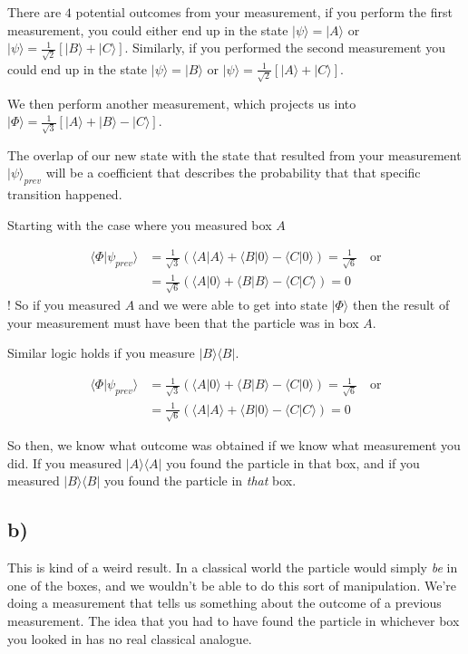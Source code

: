 \documentclass{article}
\newcommand{\p}[1]{\left(#1\right)}
\newcommand{\braket}[1]{\langle#1\rangle}
\newcommand{\bra}[1]{|#1\rangle}
\newcommand{\ket}[1]{\langle#1|}
\begin{document}

There are $4$ potential outcomes from your measurement, if you perform the first measurement, you could either end up in the state $\bra{\psi}=\bra{A}$ or $\bra{\psi}=\frac{1}{\sqrt{2}}[\bra{B}+\bra{C}]$. Similarly, if you performed the second measurement you could end up in the state $\bra{\psi}=\bra{B}$ or $\bra{\psi}=\frac{1}{\sqrt{2}}[\bra{A}+\bra{C}]$.

We then perform another measurement, which projects us into $\bra{\Phi}=\frac{1}{\sqrt{3}}[\bra{A}+\bra{B}-\bra{C}]$. 

The overlap of our new state with the state that resulted from your measurement $\bra{\psi}_{prev}$ will be a coefficient that describes the probability that that specific transition happened.

Starting with the case where you measured box $A$

\begin{align*}
    \braket{\Phi|\psi_{prev}}&=\frac{1}{\sqrt{3}}\p{\braket{A|A}+\braket{B|0}-\braket{C|0}}=\frac{1}{\sqrt{6}}\quad\text{or}\\[1em]
    &=\frac{1}{\sqrt{6}}\p{\braket{A|0}+\braket{B|B}-\braket{C|C}}=0
\end{align*}
! So if you measured $A$ and we were able to get into state $\bra{\Phi}$ then the result of your measurement must have been that the particle was in box $A$.

Similar logic holds if you measure $\bra{B}\ket{B}$.

\begin{align*}
    \braket{\Phi|\psi_{prev}}&=\frac{1}{\sqrt{3}}\p{\braket{A|0}+\braket{B|B}-\braket{C|0}}=\frac{1}{\sqrt{6}}\quad\text{or}\\[1em]
    &=\frac{1}{\sqrt{6}}\p{\braket{A|A}+\braket{B|0}-\braket{C|C}}=0
\end{align*}

So then, we know what outcome was obtained if we know what measurement you did. If you measured $\bra{A}\ket{A}$ you found the particle in that box, and if you measured $\bra{B}\ket{B}$ you found the particle in \textit{that} box.

\subsection*{b)}
This is kind of a weird result. In a classical world the particle would simply \textit{be} in one of the boxes, and we wouldn't be able to do this sort of manipulation. We're doing a measurement that tells us something about the outcome of a previous measurement. The idea that you had to have found the particle in whichever box you looked in has no real classical analogue.
\end{document}
